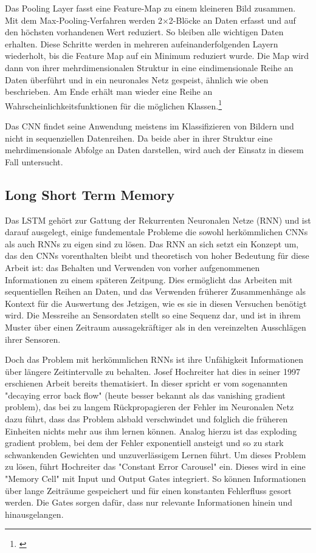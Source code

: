 Das Pooling Layer fasst eine Feature-Map zu einem kleineren Bild zusammen. Mit dem Max-Pooling-Verfahren werden 2$\times$2-Blöcke an Daten erfasst und auf den höchsten vorhandenen Wert reduziert. So bleiben alle wichtigen Daten erhalten. Diese Schritte werden in mehreren aufeinanderfolgenden Layern wiederholt, bis die Feature Map auf ein Minimum reduziert wurde. Die Map wird dann von ihrer mehrdimensionalen Struktur in eine eindimensionale Reihe an Daten überführt und in ein neuronales Netz gespeist, ähnlich wie oben beschrieben. Am Ende erhält man wieder eine Reihe an Wahrscheinlichkeitsfunktionen für die möglichen Klassen.\footnote{\cite{James2023}}

Das CNN findet seine Anwendung meistens im Klassifizieren von Bildern und nicht in sequenziellen Datenreihen. Da beide aber in ihrer Struktur eine mehrdimensionale Abfolge an Daten darstellen, wird auch der Einsatz in diesem Fall untersucht.

\subsection{Long Short Term Memory}
Das LSTM gehört zur Gattung der Rekurrenten Neuronalen Netze (RNN) und ist darauf ausgelegt, einige fundementale Probleme die sowohl herkömmlichen CNNs als auch RNNs zu eigen sind zu lösen. Das RNN an sich setzt ein Konzept um, das den CNNs vorenthalten bleibt und theoretisch von hoher Bedeutung für diese Arbeit ist: das Behalten und Verwenden von vorher aufgenommenen Informationen zu einem späteren Zeitpung. Dies ermöglicht das Arbeiten mit sequentiellen Reihen an Daten, und das Verwenden früherer Zusammenhänge als Kontext für die Auswertung des Jetzigen, wie es sie in diesen Versuchen benötigt wird. Die Messreihe an Sensordaten stellt so eine Sequenz dar, und ist in ihrem Muster über einen Zeitraum aussagekräftiger als in den vereinzelten Ausschlägen ihrer Sensoren.

Doch das Problem mit herkömmlichen RNNs ist ihre Unfähigkeit Informationen über längere Zeitintervalle zu behalten. Josef Hochreiter hat dies in seiner 1997 erschienen Arbeit bereits thematisiert. In dieser spricht er vom sogenannten "decaying error back flow" (heute besser bekannt als das vanishing gradient problem), das bei zu langem Rückpropagieren der Fehler im Neuronalen Netz dazu führt, dass das Problem alsbald verschwindet und folglich die früheren Einheiten nichts mehr aus ihm lernen können. Analog hierzu ist das exploding gradient problem, bei dem der Fehler exponentiell ansteigt und so zu stark schwankenden Gewichten und unzuverlässigem Lernen führt. Um dieses Problem zu lösen, führt Hochreiter das "Constant Error Carousel" ein. Dieses wird in eine "Memory Cell" mit Input und Output Gates integriert. So können Informationen über lange Zeiträume gespeichert und für einen konstanten Fehlerfluss gesort werden. Die Gates sorgen dafür, dass nur relevante Informationen hinein und hinausgelangen. \cite{Hochreiter1997}

